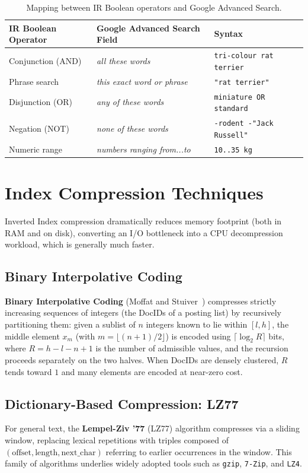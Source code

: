 \begin{table}[H]
\centering
\small
\begin{tabularx}{\textwidth}{p{3.2cm} p{3.6cm} X}
\toprule
\textbf{IR Boolean Operator} & \textbf{Google Advanced Search Field} & \textbf{Syntax} \\
\midrule
Conjunction (AND) & \textit{all these words} & \texttt{tri-colour rat terrier} \\
Phrase search & \textit{this exact word or phrase} & \texttt{"rat terrier"} \\
Disjunction (OR) & \textit{any of these words} & \texttt{miniature OR standard} \\
Negation (NOT) & \textit{none of these words} & \texttt{-rodent -"Jack Russell"} \\
Numeric range & \textit{numbers ranging from...to} & \texttt{10..35 kg} \\
\bottomrule
\end{tabularx}
\caption{Mapping between IR Boolean operators and Google Advanced Search.}
\label{tab:google-advanced-search-en}
\end{table}

\FloatBarrier
\section{Index Compression Techniques}

Inverted Index compression dramatically reduces memory footprint (both in RAM and on disk), converting an I/O bottleneck into a CPU decompression workload, which is generally much faster.

\subsection{Binary Interpolative Coding}
\textbf{Binary Interpolative Coding} (Moffat and Stuiver~\cite{moffat2000}) compresses strictly increasing sequences of integers (the DocIDs of a posting list) by recursively partitioning them: given a sublist of $n$ integers known to lie within $[l, h]$, the middle element $x_m$ (with $m = \lfloor (n+1)/2 \rfloor$) is encoded using $\lceil \log_2 R \rceil$ bits, where $R = h - l - n + 1$ is the number of admissible values, and the recursion proceeds separately on the two halves. When DocIDs are densely clustered, $R$ tends toward $1$ and many elements are encoded at near-zero cost.

\subsection{Dictionary-Based Compression: LZ77}
For general text, the \textbf{Lempel-Ziv '77} (LZ77) algorithm compresses via a sliding window, replacing lexical repetitions with triples composed of $(\text{offset}, \text{length}, \text{next\_char})$ referring to earlier occurrences in the window. This family of algorithms underlies widely adopted tools such as \texttt{gzip}, \texttt{7-Zip}, and \texttt{LZ4}.

